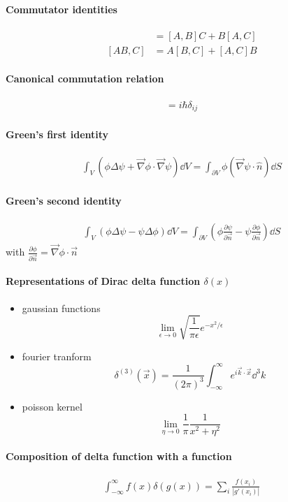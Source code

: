 \paragraph{Commutator identities}
\begin{align}
	[A, BC] &= [A, B]C + B[A, C] \\
	[AB, C] &= A[B, C] + [A, C]B
\end{align}
\paragraph{Canonical commutation relation}
\begin{align}
	[\hat{r}_i, \hat{p}_j] = i\hbar\delta_{ij}
\end{align}
\paragraph{Green's first identity}
\begin{align}
	\int_V \left(\phi\Delta \psi + \vec{\nabla}\phi \cdot \vec{\nabla}\psi \right) \dd V = \int_{\partial V} \phi \left( \vec{\nabla}\psi \cdot \hat{n} \right) \dd S
\end{align}
\paragraph{Green's second identity}
\begin{align}
	\int_V \left( \phi\Delta\psi - \psi\Delta\phi \right) \dd V = \int_{\partial V} \left( \phi\frac{\partial \psi}{\partial \vec{n}} - \psi \frac{\partial \phi}{\partial \vec{n}} \right) \dd S
\end{align}
with $\frac{\partial \phi}{\partial \vec{n}} = \vec{\nabla}\phi \cdot \vec{n}$
\paragraph{Representations of Dirac delta function $\delta(x)$}
\begin{itemize}
	\item gaussian functions $$\lim_{\epsilon \rightarrow 0}\sqrt{\frac{1}{\pi \epsilon}}e^{-x^2/\epsilon}$$
	\item fourier tranform $$\delta^{(3)}(\vec{x})=\frac{1}{(2\pi)^3}\int_{-\infty}^{\infty}e^{i\vec{k}\cdot\vec{x}}\dd^3 k$$
	\item poisson kernel $$\lim_{\eta \rightarrow 0} \frac{1}{\pi}\frac{1}{x^2 + \eta^2}$$
\end{itemize}
\paragraph{Composition of delta function with a function}
\begin{align}
	\int^{\infty}_{-\infty} f(x)\delta(g(x)) = \sum_i \frac{f(x_i)}{|g'(x_i)|}
\end{align}

